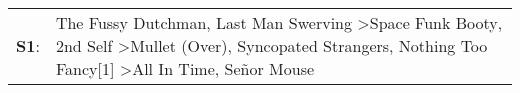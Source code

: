 \begin{supertabular}{p{0.03\textwidth}p{0.92\textwidth}}
 \textbf{S1}:  &  The Fussy Dutchman\textsuperscript{}, \enspace Last Man Swerving\textsuperscript{} \textgreater \enspace Space Funk Booty\textsuperscript{}, \enspace 2nd Self\textsuperscript{} \textgreater \enspace Mullet (Over)\textsuperscript{}, \enspace Syncopated Strangers\textsuperscript{}, \enspace Nothing Too Fancy[1]\textsuperscript{} \textgreater \enspace All In Time\textsuperscript{}, \enspace Señor Mouse\textsuperscript{}  \enspace  \\
\end{supertabular}
